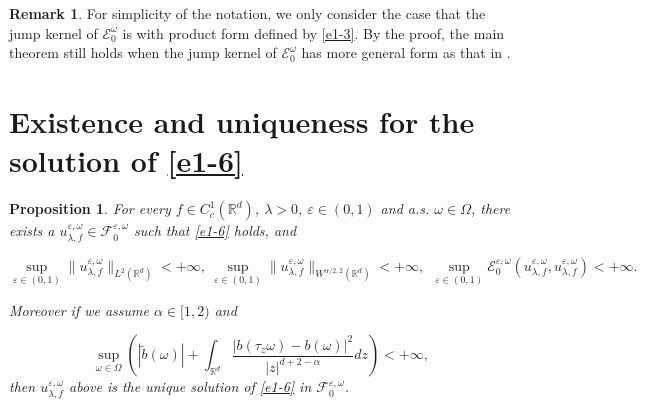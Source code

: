 \documentclass[11pt,draft, reqno]{amsart}
\def\EE{{\mathcal E}}
\def\FF{{\mathcal F}}
\newcommand{\R}{\mathds R}
\newcommand{\e}{\varepsilon}
\newcommand{\w}{\omega}
\newtheorem{proposition}[theorem]{Proposition}
\theoremstyle{definition}
\newtheorem{remark}[theorem]{Remark}
\numberwithin{equation}{section}
\begin{document}
\begin{remark}
For simplicity of the notation, we only consider the case that the jump kernel of $\EE^\w_0$
is with product form defined by \eqref{e1-3}. By the proof, the main theorem still holds when
the jump kernel of $\EE^\w_0$ has more general form as that in \cite{CCKW,CCKW1}.
\end{remark}

\section{Existence and uniqueness for the solution of \eqref{e1-6}}

\begin{proposition}\label{t1-1}
For every $f\in C_c^1(\R^d)$, $\lambda>0$, $\e\in (0,1)$ and a.s. $\w\in \Omega$, there exists a $u_{\lambda,f}^{\e,\w}\in \FF_0^{\e,\w}$ such that
\eqref{e1-6} holds,
and

\begin{equation}\label{t1-1-1a}
\sup_{\e\in (0,1)}\|u_{\lambda,f}^{\e,\w}\|_{L^2(\R^d)}<+\infty,\ \sup_{\e\in (0,1)}\|u_{\lambda,f}^{\e,\w}\|_{W^{\alpha/2,2}(\R^d)}<+\infty,\ \
\sup_{\e\in (0,1)}\EE_0^{\e,\w}\left(u_{\lambda,f}^{\e,\w},u_{\lambda,f}^{\e,\w}\right)<+\infty.
\end{equation}

Moreover if we assume $\alpha\in [1,2)$ and

\begin{equation}\label{t1-1-2a}
\sup_{\w\in \Omega}\left(|\tilde b(\w)|+\int_{\R^d}\frac{|b(\tau_z \w)-b(\w)|^2}{|z|^{d+2-\alpha}}dz\right)<+\infty,
\end{equation}
then $u_{\lambda,f}^{\e,\w}$ above is the unique solution of \eqref{e1-6} in $\FF_0^{\e,\w}$.
\end{proposition}
\end{document}
